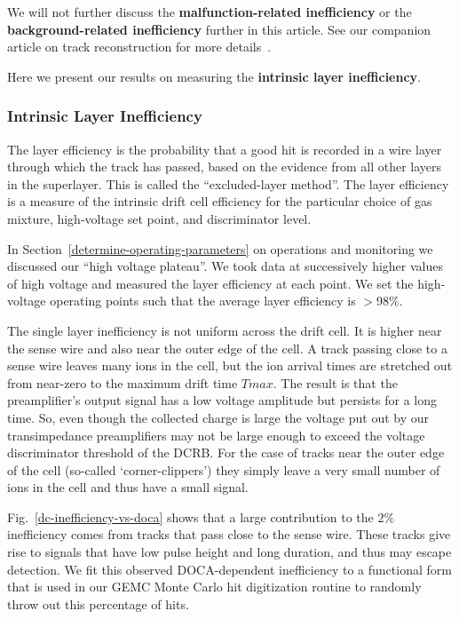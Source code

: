 We will not further discuss the {\bf malfunction-related inefficiency} or
the {\bf background-related inefficiency} further in this article.  See
our companion article on track reconstruction for more details~\cite{recon-nim}.

Here we present our results on measuring the {\bf intrinsic layer inefficiency}.

\subsubsection{Intrinsic Layer Inefficiency}

The layer efficiency is the probability that a
good hit is recorded in a wire layer through which the track has passed, based on 
the evidence from all other layers in the superlayer.  This is called the 
``excluded-layer method''.  The layer efficiency is a measure of the intrinsic drift 
cell efficiency for the particular choice of gas mixture, high-voltage set point, and 
discriminator level.  

In Section~\ref{determine-operating-parameters} on operations and monitoring we discussed
our ``high voltage plateau''. We took data at successively higher values of high voltage and measured the
layer efficiency at each point.  We set the high-voltage operating points such that
the average layer efficiency is $>$98$\%$. 

The single layer inefficiency is not uniform across the drift cell.  It is higher near the sense wire and also
near the outer edge of the cell.  A track passing close to a sense wire leaves many ions in the cell, but the
ion arrival times are stretched out from near-zero to the maximum drift time $Tmax$.  The result is that
the preamplifier's output signal has a low voltage amplitude but persists for a long time.  So, even though
the collected charge is large the voltage put out by our transimpedance preamplifiers may not be large
enough to exceed the voltage discriminator threshold of the DCRB. For the case of tracks near the outer
edge of the cell (so-called `corner-clippers') they simply leave a very small number of ions in the cell and
thus have a small signal.

Fig.~\ref{dc-inefficiency-vs-doca} shows that a large contribution to the $2\%$ inefficiency comes 
from tracks that pass close to the sense wire.  These tracks give rise to signals 
that have low pulse height and long duration, and thus may escape detection.
We fit this observed DOCA-dependent inefficiency to a functional form that is
used in our GEMC Monte Carlo hit digitization routine to randomly throw out
this percentage of hits.

